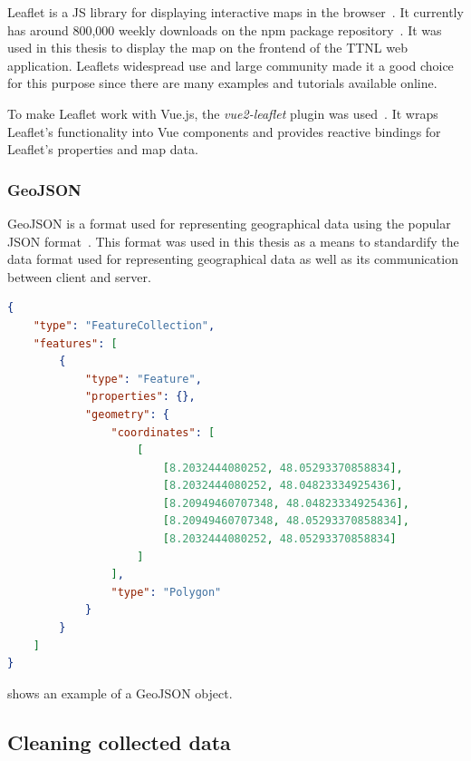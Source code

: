 Leaflet is a \ac{JS} library for displaying interactive maps in the browser~\cite{volodymyr_agafonkin_leaflet_2023}.
It currently has around 800,000 weekly downloads on the npm package repository~\cite{npm_leaflet_2023}.
It was used in this thesis to display the map on the frontend of the \ac{TTNL} web application.
Leaflets widespread use and large community made it a good choice for this purpose since there are many examples and tutorials available online.

To make Leaflet work with Vue.js, the \emph{vue2-leaflet} plugin was used~\cite{noauthor_vue_nodate}.
It wraps Leaflet's functionality into Vue components and provides reactive bindings for Leaflet's properties and map data.

\subsubsection{GeoJSON}

GeoJSON is a format used for representing geographical data using the popular \ac{JSON} format~\cite{butler_geojson_2016}.
This format was used in this thesis as a means to standardify the data format used for representing geographical data as well as its communication between client and server.

\begin{lstlisting}[language=JSON, float, caption={Example of a GeoJSON that represents a rectangle above the furtwangen city center}, label={lst:geojson-example}]
{
    "type": "FeatureCollection",
    "features": [
        {
            "type": "Feature",
            "properties": {},
            "geometry": {
                "coordinates": [
                    [
                        [8.2032444080252, 48.05293370858834],
                        [8.2032444080252, 48.04823334925436],
                        [8.20949460707348, 48.04823334925436],
                        [8.20949460707348, 48.05293370858834],
                        [8.2032444080252, 48.05293370858834]
                    ]
                ],
                "type": "Polygon"
            }
        }
    ]
}  
\end{lstlisting}

 shows an example of a GeoJSON object.


\subsection{Cleaning collected data}

